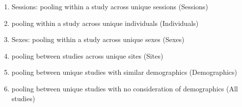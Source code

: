 \documentclass[11pt]{article}
\begin{document}
\begin{enumerate}[wide, labelwidth=!, labelindent=0pt, label=\bf{\arabic*)}]
\item{Sessions: pooling within a study across unique sessions (Sessions)}
\item{pooling within a study across unique individuals (Individuals)}
\item{Sexes: pooling within a study across unique sexes (Sexes)}
\item{pooling between studies across unique sites (Sites)}
\item{pooling between unique studies with similar demographics (Demographics)}
\item{pooling between unique studies with no consideration of demographics (All studies)}
\end{enumerate}
%
%

\end{document}
